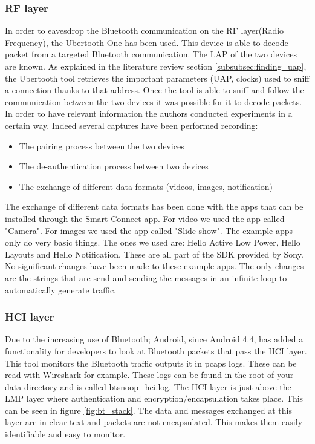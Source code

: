 \subsubsection{RF layer}
In order to eavesdrop the Bluetooth communication on the RF layer(Radio Frequency), the Ubertooth One has been used. This device is able to decode packet from a targeted Bluetooth communication. \pend
The LAP of the two devices are known. As explained in the literature review section \ref{subsubsec:finding_uap}, the Ubertooth tool retrieves the important parameters (UAP, clocks) used to sniff a connection thanks to that address. Once the tool is able to sniff and follow the communication between the two devices it was possible for it to decode packets.
In order to have relevant information the authors conducted experiments in a certain way. Indeed several captures have been performed recording:
\begin{itemize}
	\item The pairing process between the two devices
	\item The de-authentication process between two devices
	\item The exchange of different data formats (videos, images, notification) 
\end{itemize}
The exchange of different data formats has been done with the apps that can be installed through the Smart Connect app. For video we used the app called "Camera". For images we used the app called "Slide show". \pend The example apps only do very basic things. The ones we used are: Hello Active Low Power, Hello Layouts and Hello Notification. These are all part of the SDK provided by Sony.
No significant changes have been made to these example apps. The only changes are the strings that are send and sending the messages in an infinite loop to automatically generate traffic.

\subsubsection{HCI layer}
Due to the increasing use of Bluetooth; Android, since Android 4.4, has added a functionality for developers to look at Bluetooth packets that pass the HCI layer. This tool monitors the Bluetooth traffic outputs it in pcaps logs. These can be read with Wireshark for example. These logs can be found in the root of your data directory and is called btsnoop\_hci.log. \pend
The HCI layer is just above the LMP layer where authentication and encryption/encapsulation takes place. This can be seen in figure \ref{fig:bt_stack}. The data and messages exchanged at this layer are in clear text and packets are not encapsulated. This makes them easily identifiable and easy to monitor.